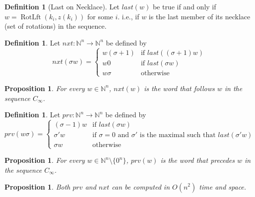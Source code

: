 \documentclass{article}
\newtheorem{proposition}[theorem]{Proposition}
\theoremstyle{definition}
\newtheorem{definition}[theorem]{Definition}
\DeclareMathOperator{\RotateLeft}{RotLft}
\newcommand{\N}{{\mathbb{N}}}
\begin{document}
\begin{definition}[Last on Necklace]
Let $last(w)$ be true if and only if $w=\RotateLeft(k_i,z(k_i))$ for some $i$. i.e., if $w$ is the last member of its necklace (set of rotations) in the sequence. 
\end{definition}


\begin{definition}
Let $nxt\colon \N^n \to \N^n$ be defined by
$$nxt(\sigma w)=\begin{cases} 
w(\sigma+1) & \text{if }last((\sigma+1)w) \\
w0          & \text{if }last(\sigma w) \\
w\sigma     & \text{otherwise} 
\end{cases}$$
\end{definition}

\begin{proposition}
For every $w\in \N^n$, $nxt(w)$ is the word that follows $w$ in the sequence $C_\infty$.
\end{proposition}


\begin{definition}
Let $prv\colon \N^n \to \N^n$ be defined by
$$prv(w\sigma)=\begin{cases} 
(\sigma-1)w & \text{if }last(\sigma w) \\
\sigma'w   & \text{if $\sigma =0$  and $\sigma'$ is the maximal such that $last(\sigma' w)$} \\
\sigma w     & \text{otherwise} 
\end{cases}$$
\end{definition}
 
\begin{proposition}
For every $w\in \N^n\setminus \{0^n\}$, $prv(w)$ is the word that precedes $w$ in the sequence $C_\infty$.
\end{proposition}

\begin{proposition}
Both $prv$ and $nxt$ can be computed in $O(n^2)$ time and space.
\end{proposition}   
\end{document}
